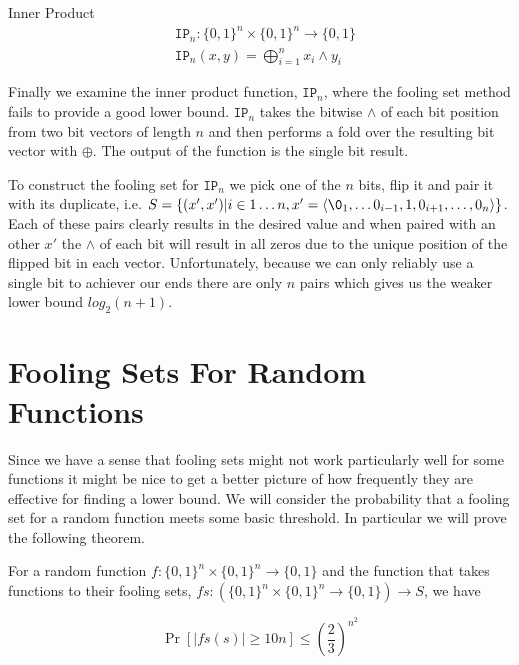 \documentclass[usletter]{article}
\begin{document}
\begin{example}
  Inner Product
  \begin{align*}
    & \mathtt{IP}_n : \{0,1\}^n \times \{0,1\}^n \rightarrow \{0,1\} \\
    & \mathtt{IP}_n(x, y) = \bigoplus_{i=1}^n x_i \land y_i
  \end{align*}
\end{example}

Finally we examine the inner product function, $\mathtt{IP}_n$, where the fooling set method fails to provide a good lower bound. $\mathtt{IP}_n$ takes the bitwise $\land$ of each bit position from two bit vectors of length $n$ and then performs a fold over the resulting bit vector with $\oplus$. The output of the function is the single bit result.

To construct the fooling set for $\mathtt{IP}_n$ we pick one of the $n$ bits, flip it and pair it with its duplicate, i.e. $S = \{ (x', x') | i \in 1 \ldots n, x' = \langle \0_1, \ldots 0_{i-1},1,0_{i+1}, \ldots, 0_n \rangle \}$. Each of these pairs clearly results in the desired value and when paired with an other $x'$ the $\land$ of each bit will result in all zeros due to the unique position of the flipped bit in each vector. Unfortunately, because we can only reliably use a single bit to achiever our ends there are only $n$ pairs which gives us the weaker lower bound $log_2(n+1)$.

\section{Fooling Sets For Random Functions} \label{sec:fooling-set-random}

Since we have a sense that fooling sets might not work particularly well for some functions it might be nice to get a better picture of how frequently they are effective for finding a lower bound. We will consider the probability that a fooling set for a random function meets some basic threshold. In particular we will prove the following theorem.

\begin{theorem}
For a random function $f : \{0,1\}^n \times \{0,1\}^n \rightarrow \{0,1\}$ and the function that takes functions to their fooling sets, $fs : (\{0,1\}^n \times \{0,1\}^n \rightarrow \{0,1\}) \rightarrow S$, we have

\begin{equation*}
\Pr\left[ |fs(s)| \geq 10n \right] \leq \left(\frac{2}{3}\right)^{n^{2}}
\end{equation*}
\end{theorem}
\end{document}
